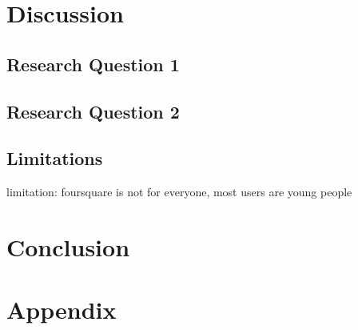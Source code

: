 \documentclass{article}
\begin{document}
\section{Discussion}
\subsection{Research Question 1}

\subsection{Research Question 2}

\subsection{Limitations}
limitation: foursquare is not for everyone, most users are young people


\newpage


\section{Conclusion}
\newpage







\newpage
\section{Appendix}
\end{document}
